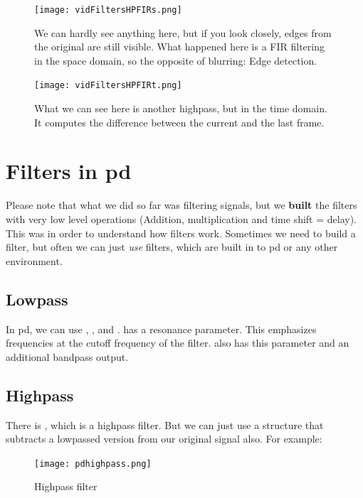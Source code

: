 {\begin{figure}[H]
	\begin{center}
		\texttt{[image: vidFiltersHPFIRs.png]}
		\caption[Video Filters: FIR Highpass, space domain]
		{We can hardly see anything here, but if you look closely, edges from the original are still visible. What happened here is a FIR filtering in the space domain, so the opposite of blurring: Edge detection.}
		\label{fig:name}
	\end{center}
\end{figure}



\begin{figure}[H]
	\begin{center}
		\texttt{[image: vidFiltersHPFIRt.png]}
		\caption[Video Filters: FIR Highpass, time domain]
		{What we can see here is another highpass, but in the time domain. It computes the difference between the current and the last frame.}
		\label{fig:name}
	\end{center}
\end{figure}





}

\section{Filters in pd}
Please note that what we did so far was filtering signals, but we \textbf{built} the filters with very low level operations (Addition, multiplication and time shift = delay). This was in order to understand how filters work. Sometimes we need to build a filter, but often we can just \textit{use} filters, which are built in to pd or any other environment.\\
\subsection{Lowpass}
In pd, we can use , ,  and .  has a resonance parameter. This emphasizes frequencies at the cutoff frequency of the filter.  also has this parameter and an additional bandpass output.

\subsection{Highpass}
There is , which is a highpass filter. But we can just use a structure that subtracts a lowpassed version from our original signal also. For example:
\begin{figure}[H]
	\begin{center}
		\texttt{[image: pdhighpass.png]}
		\caption{Highpass filter}
		\label{fig:name}
	\end{center}
\end{figure}

